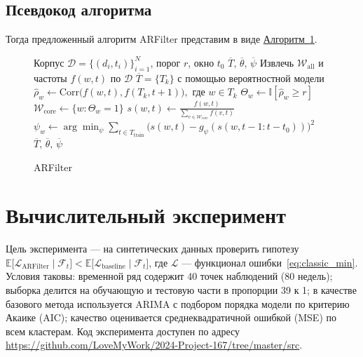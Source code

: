 \documentclass[14pt,a4paper]{article}
\begin{document}

\newpage
\subsection{Псевдокод алгоритма}
\label{ssec:pseudocode}

Тогда предложенный алгоритм ARFilter представим в виде \hyperref[alg:selection]{Алгоритм~\ref{alg:selection}}.

\begin{figure}[h]
  \centering
  \begin{minipage}{.9\linewidth}
    \begin{algorithm}[H]
      \caption{ARFilter}\label{alg:selection}
      \begin{algorithmic}[1]
        \Require Корпус \(\mathcal{D}=\{(d_i,t_i)\}_{i=1}^N\), порог \(r\), окно \(t_0\)
        \Ensure \(\overline{T},\,\overline{\theta},\,\overline{\psi}\)
        \State Извлечь \(\mathcal{W}_{\mathrm{all}}\) и частоты \(f(w,t)\) по $\mathcal{D}$
        \State \(\overline{T}=\{T_k\}\) с помощью вероятностной модели
          \State \(\widehat\rho_w\gets\mathrm{Corr}\bigl(f(w,t),f(T_k,t+1)\bigr),\text{ где } w \in T_k\)
          \State \(\Theta_w\gets\mathbb I[\widehat\rho_w\ge r]\)
        \EndFor
        \State \(\mathcal{W}_{\mathrm{core}}\gets\{w:\Theta_w=1\}\)
          \State \(s(w,t)\gets \frac{f(w,t)}{\sum_{v\in\mathcal{W}_{\mathrm{core}}}f(v,t)}\)
          \State \(\psi_w\gets\arg\min_{\psi}\sum_{t\in T_{\mathrm{train}}}\bigl(s(w,t)-g_{\psi}(s(w,t-1:t-t_0))\bigr)^2\)
        \EndFor
        \State \Return \(\overline{T},\,\overline{\theta},\,\overline{\psi}\)
      \end{algorithmic}
    \end{algorithm}
  \end{minipage}
\end{figure}


\newpage
\section{Вычислительный эксперимент}
Цель эксперимента — на синтетических данных проверить гипотезу \(\mathbb{E}\bigl[\mathcal L_{\mathrm{ARFilter}}\mid\mathcal F_{t}\bigr]<\mathbb{E}\bigl[\mathcal L_{\mathrm{baseline}}\mid\mathcal F_{t}\bigr]\), где \(\mathcal L\) — функционал ошибки~\eqref{eq:classic_min}. Условия таковы: временной ряд содержит 40 точек наблюдений (80 недель); выборка делится на обучающую и тестовую части в пропорции 39 к 1; в качестве базового метода используется ARIMA с подбором порядка модели по критерию Акаике (AIC); качество оценивается среднеквадратичной ошибкой (MSE) по всем кластерам. Код эксперимента доступен по адресу \url{https://github.com/LoveMyWork/2024-Project-167/tree/master/src}.
\end{document}
